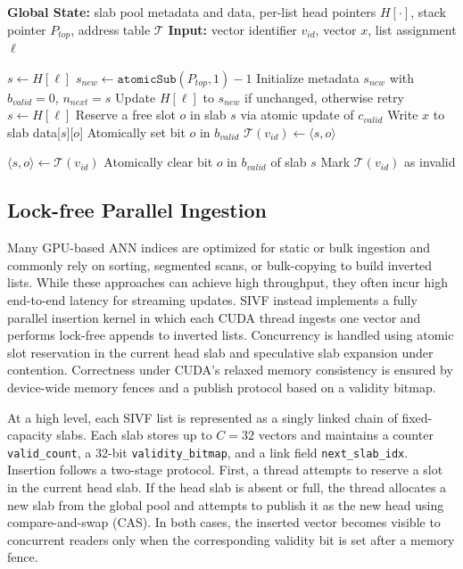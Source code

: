 \documentclass[sigconf,nonacm]{acmart}
\theoremstyle{plain}
\theoremstyle{definition}
\theoremstyle{remark}
\begin{document}
\begin{algorithm}[t]
\caption{Core Operations of SDMA}
\label{alg:sdma_core}
\begin{algorithmic}[1]
\State \textbf{Global State:} slab pool metadata and data, per-list head pointers $H[\cdot]$, stack pointer $P_{top}$, address table $\mathcal{T}$
\State \textbf{Input:} vector identifier $v_{id}$, vector $x$, list assignment $\ell$

    \State $s \gets H[\ell]$
        \State $s_{new} \gets \texttt{atomicSub}(P_{top}, 1) - 1$
        \State Initialize metadata $s_{new}$ with $b_{valid}=0$, $n_{next}=s$
        \State Update $H[\ell]$ to $s_{new}$ if unchanged, otherwise retry
        \State $s \gets H[\ell]$
    \EndWhile
    \State Reserve a free slot $o$ in slab $s$ via atomic update of $c_{valid}$
    \State Write $x$ to slab data[$s$][$o$]
    \State Atomically set bit $o$ in $b_{valid}$
    \State $\mathcal{T}(v_{id}) \gets \langle s, o \rangle$
\EndProcedure

    \State $\langle s, o \rangle \gets \mathcal{T}(v_{id})$
        \State Atomically clear bit $o$ in $b_{valid}$ of slab $s$
        \State Mark $\mathcal{T}(v_{id})$ as invalid
    \EndIf
\EndProcedure
\end{algorithmic}
\end{algorithm}

\subsection{Lock-free Parallel Ingestion}
\label{sec:lock_free_ingestion}

Many GPU-based ANN indices are optimized for static or bulk ingestion and commonly rely on sorting, segmented scans, or bulk-copying to build inverted lists. While these approaches can achieve high throughput, they often incur high end-to-end latency for streaming updates. SIVF instead implements a fully parallel insertion kernel in which each CUDA thread ingests one vector and performs lock-free appends to inverted lists. Concurrency is handled using atomic slot reservation in the current head slab and speculative slab expansion under contention. Correctness under CUDA's relaxed memory consistency is ensured by device-wide memory fences and a publish protocol based on a validity bitmap.

At a high level, each SIVF list is represented as a singly linked chain of fixed-capacity slabs. Each slab stores up to $C=32$ vectors and maintains a counter \texttt{valid\_count}, a 32-bit \texttt{validity\_bitmap}, and a link field \texttt{next\_slab\_idx}. Insertion follows a two-stage protocol. First, a thread attempts to reserve a slot in the current head slab. If the head slab is absent or full, the thread allocates a new slab from the global pool and attempts to publish it as the new head using compare-and-swap (CAS). In both cases, the inserted vector becomes visible to concurrent readers only when the corresponding validity bit is set after a memory fence.
\end{document}
